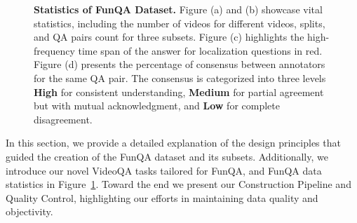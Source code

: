\begin{figure}[!t]
    
  \vspace{-10pt}
  \caption{\textbf{Statistics of FunQA Dataset.} 
 Figure (a) and (b) showcase vital statistics, including the number of videos for different videos, splits, and QA pairs count for three subsets. Figure (c) highlights the high-frequency time span of the answer for localization questions in red. Figure (d) presents the percentage of consensus between annotators for the same QA pair. The consensus is categorized into three levels \textbf{High} for consistent understanding, \textbf{Medium} for partial agreement but with mutual acknowledgment, and \textbf{Low} for complete disagreement.
  }
  \vspace{-0.4cm}
  \label{fig:dataset statistics}
\end{figure}

In this section, we provide a detailed explanation of the design principles that guided the creation of the FunQA dataset and its subsets. Additionally, we introduce our novel VideoQA tasks tailored for FunQA, and FunQA data statistics in Figure~\ref{fig:dataset statistics}. 
Toward the end we present our Construction Pipeline and Quality Control, highlighting our efforts in maintaining data quality and objectivity.


